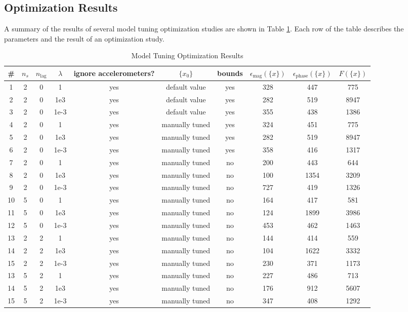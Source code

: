 \subsection{Optimization Results}

A summary of the results of several model tuning optimization studies are shown in Table \ref{tab:optResult}. Each row of the table describes the parameters and the result of an optimization study.

\begin{landscape}
\begin{table}[H]
	\centering
	\label{tab:optResult}
	\caption{Model Tuning Optimization Results}
	\begin{tabular}{cccccccccc}
		\hline\hline
		\# & $n_s$ & $n_\text{lag}$ & $\lambda$ & ignore accelerometers? & $\{x_0\}$ & bounds & $\epsilon_\text{mag}(\{x\})$ & $\epsilon_\text{phase}(\{x\})$ & $F(\{x\})$ \\
		\hline
		1 & 2 & 0 & 1 & yes & default value & yes & 328 & 447 & 775 \\
		2 & 2 & 0 & 1e3 & yes & default value & yes & 282 & 519 & 8947 \\
		3 & 2 & 0 & 1e-3 & yes & default value & yes & 355 & 438 & 1386 \\
		4 & 2 & 0 & 1 & yes & manually tuned & yes & 324 & 451 & 775 \\
		5 & 2 & 0 & 1e3 & yes & manually tuned & yes & 282 & 519 & 8947 \\
		6 & 2 & 0 & 1e-3 & yes & manually tuned & yes & 358 & 416 & 1317 \\
		7 & 2 & 0 & 1 & yes & manually tuned & no & 200 & 443 & 644 \\
		8 & 2 & 0 & 1e3 & yes & manually tuned & no & 100 & 1354 & 3209 \\
		9 & 2 & 0 & 1e-3 & yes & manually tuned & no & 727 & 419 & 1326 \\
		10 & 5 & 0 & 1 & yes & manually tuned & no & 164 & 417 & 581 \\
		11 & 5 & 0 & 1e3 & yes & manually tuned & no & 124 & 1899 & 3986 \\
		12 & 5 & 0 & 1e-3 & yes & manually tuned & no & 453 & 462 & 1463 \\
		13 & 2 & 2 & 1 & yes & manually tuned & no & 144 & 414 & 559 \\
		14 & 2 & 2 & 1e3 & yes & manually tuned & no & 104 & 1622 & 3332 \\
		15 & 2 & 2 & 1e-3 & yes & manually tuned & no & 230 & 371 & 1173 \\
		13 & 5 & 2 & 1 & yes & manually tuned & no & 227 & 486 & 713 \\
		14 & 5 & 2 & 1e3 & yes & manually tuned & no & 176 & 912 & 5607 \\
		15 & 5 & 2 & 1e-3 & yes & manually tuned & no & 347 & 408 & 1292 \\
		\hline\hline
	\end{tabular}
\end{table}
\end{landscape}

